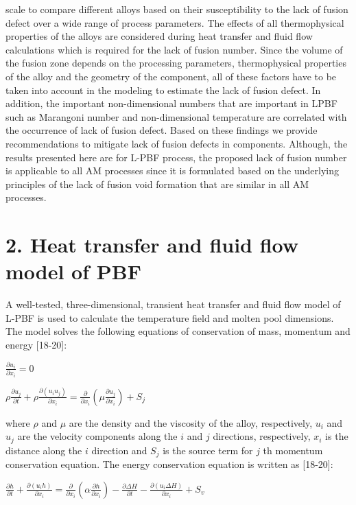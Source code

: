 \documentclass[10pt]{article}
\begin{document}
scale to compare different alloys based on their susceptibility to the lack of fusion defect over a wide range of process parameters. The effects of all thermophysical properties of the alloys are considered during heat transfer and fluid flow calculations which is required for the lack of fusion number. Since the volume of the fusion zone depends on the processing parameters, thermophysical properties of the alloy and the geometry of the component, all of these factors have to be taken into account in the modeling to estimate the lack of fusion defect. In addition, the important non-dimensional numbers that are important in LPBF such as Marangoni number and non-dimensional temperature are correlated with the occurrence of lack of fusion defect. Based on these findings we provide recommendations to mitigate lack of fusion defects in components. Although, the results presented here are for L-PBF process, the proposed lack of fusion number is applicable to all AM processes since it is formulated based on the underlying principles of the lack of fusion void formation that are similar in all AM processes.

\section*{2. Heat transfer and fluid flow model of PBF}
A well-tested, three-dimensional, transient heat transfer and fluid flow model of L-PBF is used to calculate the temperature field and molten pool dimensions. The model solves the following equations of conservation of mass, momentum and energy [18-20]:

$\frac{\partial u_{i}}{\partial x_{i}}=0$

$\rho \frac{\partial u_{j}}{\partial t}+\rho \frac{\partial\left(u_{i} u_{j}\right)}{\partial x_{i}}=\frac{\partial}{\partial x_{i}}\left(\mu \frac{\partial u_{j}}{\partial x_{i}}\right)+S_{j}$

where $\rho$ and $\mu$ are the density and the viscosity of the alloy, respectively, $u_{i}$ and $u_{j}$ are the velocity components along the $i$ and $j$ directions, respectively, $x_{i}$ is the distance along the $i$ direction and $S_{j}$ is the source term for $j$ th momentum conservation equation. The energy conservation equation is written as [18-20]:

$\frac{\partial h}{\partial t}+\frac{\partial\left(u_{i} h\right)}{\partial x_{i}}=\frac{\partial}{\partial x_{i}}\left(\alpha \frac{\partial h}{\partial x_{i}}\right)-\frac{\partial \Delta H}{\partial t}-\frac{\partial\left(u_{i} \Delta H\right)}{\partial x_{i}}+S_{v}$
\end{document}
